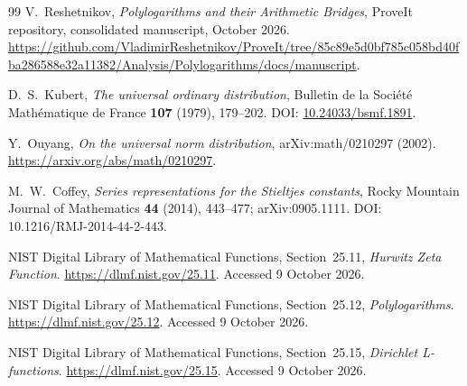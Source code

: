 \documentclass[11pt]{article}
\numberwithin{equation}{section}
\theoremstyle{definition}\newtheorem{definition}[theorem]{Definition}
\theoremstyle{remark}\newtheorem{remark}[theorem]{Remark}
\begin{document}
\begin{thebibliography}{99}
V.~Reshetnikov, \emph{Polylogarithms and their Arithmetic Bridges},
ProveIt repository, consolidated manuscript, October 2026.
\url{https://github.com/VladimirReshetnikov/ProveIt/tree/85c89e5d0bf785c058bd40fba286588e32a11382/Analysis/Polylogarithms/docs/manuscript}.

D.~S.~Kubert, \emph{The universal ordinary distribution},
Bulletin de la Soci\'et\'e Math\'ematique de France \textbf{107} (1979),
179--202. DOI: \href{https://doi.org/10.24033/bsmf.1891}{10.24033/bsmf.1891}.

Y.~Ouyang, \emph{On the universal norm distribution},
arXiv:math/0210297 (2002).
\url{https://arxiv.org/abs/math/0210297}.

M.~W.~Coffey, \emph{Series representations for the Stieltjes constants},
Rocky Mountain Journal of Mathematics \textbf{44} (2014), 443--477;
arXiv:0905.1111. DOI: 10.1216/RMJ-2014-44-2-443.

NIST Digital Library of Mathematical Functions,
Section~25.11, \emph{Hurwitz Zeta Function}.
\url{https://dlmf.nist.gov/25.11}. Accessed 9 October 2026.

NIST Digital Library of Mathematical Functions,
Section~25.12, \emph{Polylogarithms}.
\url{https://dlmf.nist.gov/25.12}. Accessed 9 October 2026.

NIST Digital Library of Mathematical Functions,
Section~25.15, \emph{Dirichlet L-functions}.
\url{https://dlmf.nist.gov/25.15}. Accessed 9 October 2026.
\end{thebibliography}
\end{document}
